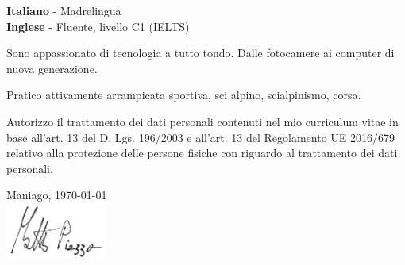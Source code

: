 \documentclass[9pt]{developercv} %
\begin{document}
%
%
\begin{minipage}[t]{0.3\textwidth}
	\vspace{-\baselineskip} %
%
	\textbf{Italiano} - Madrelingua\\
	\textbf{Inglese}  - Fluente, livello C1 (IELTS)
%
\end{minipage}
\hfill
\begin{minipage}[t]{0.3\textwidth}
	\vspace{-\baselineskip} %
	Sono appassionato di tecnologia a tutto tondo. Dalle fotocamere ai computer di nuova generazione.
%
%
\end{minipage}
\hfill
\begin{minipage}[t]{0.3\textwidth}
	\vspace{-\baselineskip} %
%
	Pratico attivamente arrampicata sportiva, sci alpino, scialpinismo, corsa.
%
\end{minipage}

\hfill
\pagebreak



Autorizzo il trattamento dei dati personali contenuti nel mio curriculum vitae in base all’art. 13 del D. Lgs. 196/2003 e all’art. 13 del Regolamento UE 2016/679 relativo alla protezione delle persone fisiche con riguardo al trattamento dei dati personali.

\vspace{0.5cm}
Maniago, \today \\

\vspace{0.2cm}
\includegraphics[width=0.25\textwidth]{firma.jpg}
\end{document}

